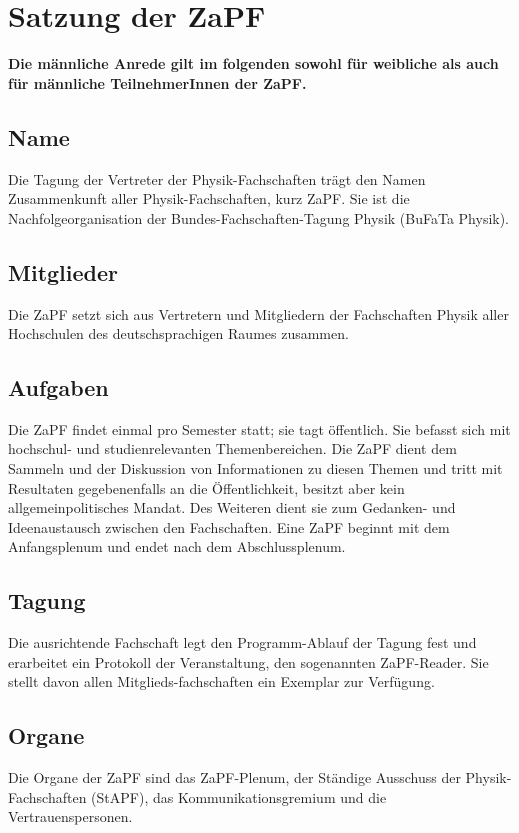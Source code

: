 \documentclass[draft,12pt,oneside]{scrreprt}
\begin{document}
\chapter*{Satzung der ZaPF}

\textbf{Die männliche Anrede gilt im folgenden sowohl für weibliche
als auch für männliche TeilnehmerInnen der ZaPF.}

\section{Name}
Die Tagung der Vertreter der Physik-Fachschaften trägt den Namen Zusammenkunft
aller Physik-Fachschaften, kurz ZaPF.  Sie ist die Nachfolgeorganisation der
Bundes-Fachschaften-Tagung Physik (BuFaTa Physik).

\section{Mitglieder}
Die ZaPF setzt sich aus Vertretern und Mitgliedern der Fachschaften Physik
aller Hochschulen des deutschsprachigen Raumes zusammen.

\section{Aufgaben}
Die ZaPF findet einmal pro Semester statt; sie tagt öffentlich. Sie befasst
sich mit hochschul- und studienrelevanten Themenbereichen.  Die ZaPF dient dem
Sammeln und der Diskussion von Informationen zu diesen Themen und tritt mit
Resultaten gegebenenfalls an die Öffentlichkeit, besitzt aber kein
allgemeinpolitisches Mandat. Des Weiteren dient sie zum Gedanken- und
Ideenaustausch zwischen den Fachschaften. Eine ZaPF beginnt mit dem
Anfangsplenum und endet nach dem Abschlussplenum.

\section{Tagung}
Die ausrichtende Fachschaft legt den Programm-Ablauf der Tagung fest und
erarbeitet ein Protokoll der Veranstaltung, den sogenannten ZaPF-Reader. Sie
stellt davon allen Mitglieds-fachschaften ein Exemplar zur Verfügung.

\section{Organe}

Die Organe der ZaPF sind das ZaPF-Plenum, der Ständige Ausschuss der
Physik-Fachschaften (StAPF), das Kommunikationsgremium und die Vertrauenspersonen.
\end{document}
